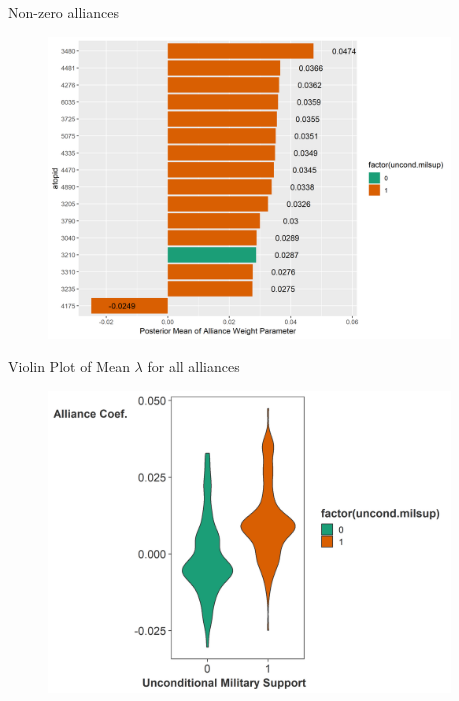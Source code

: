 \documentclass{beamer}
\begin{document}

\begin{frame}{Non-zero alliances}

\begin{figure}
	\centering
		\includegraphics[width=0.95\textwidth]{non-zero alliances.png}
	\label{fig:non-zero alliances}
\end{figure}


\end{frame}


\begin{frame}{Violin Plot of Mean $\lambda$ for all alliances}

\begin{figure}
	\centering
		\includegraphics[width=0.95\textwidth]{lambda-box-presentation.png}
	\label{fig:lambda-box-presentation}
\end{figure}


\end{frame}


\end{document}
